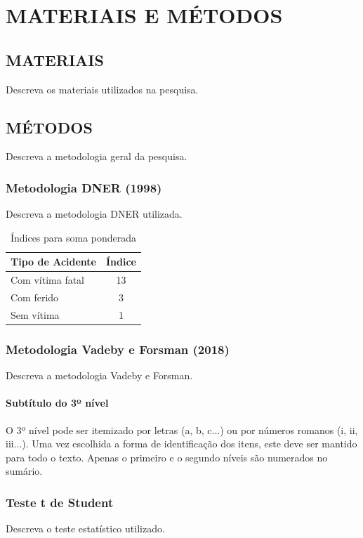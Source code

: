 \chapter{MATERIAIS E MÉTODOS}
\label{capitulo3}

\section{MATERIAIS}

Descreva os materiais utilizados na pesquisa.

\section{MÉTODOS}

Descreva a metodologia geral da pesquisa.

\subsection{Metodologia DNER (1998)}

Descreva a metodologia DNER utilizada.

\begin{table}[htbp]
  \centering
  \caption{Índices para soma ponderada}
  \label{tab:indices_ponderada}
  \small
  \begin{tabular}{lc}
    \hline
    \textbf{Tipo de Acidente} & \textbf{Índice} \\
    \hline
    Com vítima fatal & 13 \\
    Com ferido & 3 \\
    Sem vítima & 1 \\
    \hline
  \end{tabular}
\end{table}

\subsection{Metodologia Vadeby e Forsman (2018)}

Descreva a metodologia Vadeby e Forsman.

\subsubsection{Subtítulo do 3º nível}

O 3º nível pode ser itemizado por letras (a, b, c...) ou por números romanos (i, ii, iii...). Uma vez escolhida a forma de identificação dos itens, este deve ser mantido para todo o texto. Apenas o primeiro e o segundo níveis são numerados no sumário.

\subsection{Teste t de Student}

Descreva o teste estatístico utilizado.
